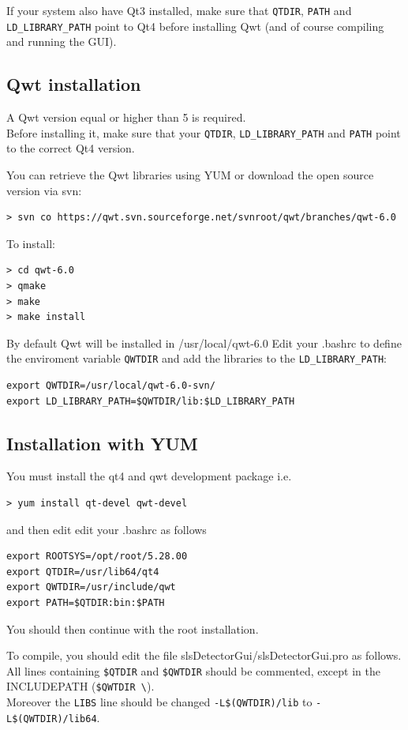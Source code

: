 \documentclass{article}
\begin{document}
If your system also have Qt3 installed, make sure that  \verb=QTDIR=, \verb=PATH= and \verb=LD_LIBRARY_PATH= point to Qt4 before installing Qwt (and of course compiling and running the GUI).

\subsection{Qwt installation}
A Qwt version equal or higher than 5 is required.\\
Before installing it, make sure that your  \verb=QTDIR=, \verb=LD_LIBRARY_PATH= and \verb=PATH= point to the correct Qt4 version.

You can retrieve the Qwt libraries using YUM or download the open source version via svn:
\begin{verbatim}
> svn co https://qwt.svn.sourceforge.net/svnroot/qwt/branches/qwt-6.0
\end{verbatim}

To install:
\begin{verbatim}
> cd qwt-6.0
> qmake
> make
> make install
\end{verbatim}

By default Qwt will be installed in /usr/local/qwt-6.0
Edit your .bashrc to define the enviroment variable \verb=QWTDIR= and add the libraries to the \verb=LD_LIBRARY_PATH=:
\begin{verbatim}
export QWTDIR=/usr/local/qwt-6.0-svn/
export LD_LIBRARY_PATH=$QWTDIR/lib:$LD_LIBRARY_PATH
\end{verbatim}

\subsection{Installation with YUM}

You must install the qt4 and qwt development package i.e.
\begin{verbatim}
> yum install qt-devel qwt-devel 
\end{verbatim}
 and then edit edit your .bashrc as follows
\begin{verbatim}
export ROOTSYS=/opt/root/5.28.00
export QTDIR=/usr/lib64/qt4
export QWTDIR=/usr/include/qwt
export PATH=$QTDIR:bin:$PATH
\end{verbatim}

You should then continue with the root installation.

To compile, you should edit the file slsDetectorGui/slsDetectorGui.pro as follows.\\
All lines containing \verb=$QTDIR= and \verb=$QWTDIR= should be commented, except in the INCLUDEPATH (\verb=$QWTDIR \=).\\
Moreover the  \verb=LIBS= line should be changed \verb=-L$(QWTDIR)/lib= to \verb=-L$(QWTDIR)/lib64=. 
\end{document}

